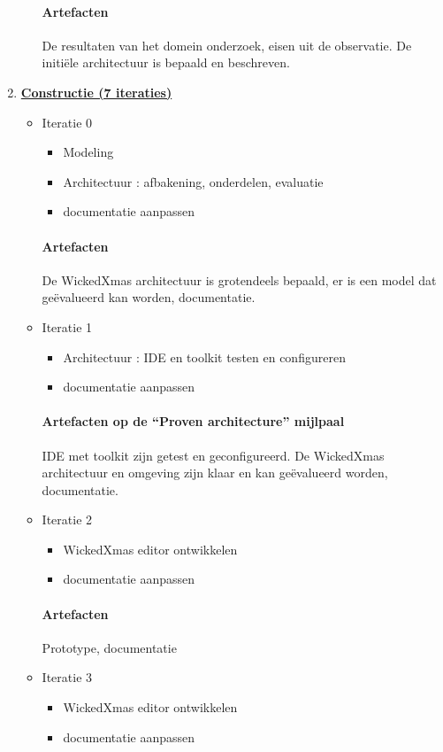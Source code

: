 \begin{enumerate}
\begin{itemize}
		\paragraph{Artefacten}
		De resultaten van het domein onderzoek, eisen uit de observatie.
		De initi\"ele architectuur is bepaald en beschreven.
		\end{itemize}

\item \underline{\textbf{Constructie (7 iteraties)}}
	\begin{itemize}
	\item Iteratie 0
		\begin{itemize}
		\item Modeling
		\item Architectuur : afbakening,  onderdelen, evaluatie
		\item documentatie aanpassen
		\end{itemize}
		\paragraph{Artefacten}
		 De WickedXmas architectuur is grotendeels bepaald, er is een model dat ge\"evalueerd kan worden, documentatie.
	\item Iteratie 1
		\begin{itemize}
		\item Architectuur : IDE en toolkit testen en configureren
		\item documentatie aanpassen
		\end{itemize}
		\paragraph{Artefacten op de ``Proven architecture'' mijlpaal}
		 IDE met toolkit zijn getest en geconfigureerd.
		 De WickedXmas architectuur en omgeving zijn klaar en kan ge\"evalueerd worden, documentatie.
	\item Iteratie 2
		\begin{itemize}
		\item WickedXmas editor ontwikkelen
		\item documentatie aanpassen
		\end{itemize}
		\paragraph{Artefacten}
		Prototype, documentatie
	\item Iteratie 3
		\begin{itemize}
		\item WickedXmas editor ontwikkelen
		\item documentatie aanpassen
		\end{itemize}

\end{itemize}
\end{enumerate}
